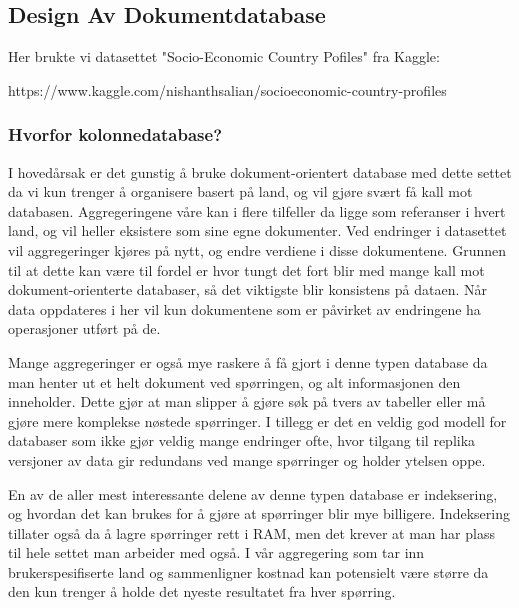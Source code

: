 \subsection{Design Av Dokumentdatabase}
Her brukte vi datasettet "Socio-Economic Country Pofiles" fra Kaggle:

https://www.kaggle.com/nishanthsalian/socioeconomic-country-profiles

\subsubsection{Hvorfor kolonnedatabase?}
I hovedårsak er det gunstig å bruke dokument-orientert database med dette settet da vi kun trenger å organisere basert på land, og vil gjøre svært få kall mot databasen. Aggregeringene våre kan i flere tilfeller da ligge som referanser i hvert land, og vil heller eksistere som sine egne dokumenter. Ved endringer i datasettet vil aggregeringer kjøres på nytt, og endre verdiene i disse dokumentene. Grunnen til at dette kan være til fordel er hvor tungt det fort blir med mange kall mot dokument-orienterte databaser, så det viktigste blir konsistens på dataen. Når data oppdateres i her vil kun dokumentene som er påvirket av endringene ha operasjoner utført på de.

Mange aggregeringer er også mye raskere å få gjort i denne typen database da man henter ut et helt dokument ved spørringen, og alt informasjonen den inneholder. Dette gjør at man slipper å gjøre søk på tvers av tabeller eller må gjøre mere komplekse nøstede spørringer. I tillegg er det en veldig god modell for databaser som ikke gjør veldig mange endringer ofte, hvor tilgang til replika versjoner av data gir redundans ved mange spørringer og holder ytelsen oppe.

En av de aller mest interessante delene av denne typen database er indeksering, og hvordan det kan brukes for å gjøre at spørringer blir mye billigere. Indeksering tillater også da å lagre spørringer rett i RAM, men det krever at man har plass til hele settet man arbeider med også. I vår aggregering som tar inn brukerspesifiserte land og sammenligner kostnad kan potensielt være større da den kun trenger å holde det nyeste resultatet fra hver spørring.

